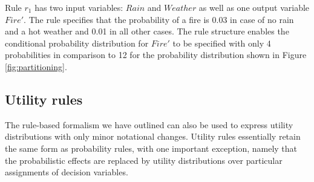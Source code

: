 Rule $r_1$ has two input variables: $\mathit{Rain}$ and $\mathit{Weather}$ as well as one output variable $\mathit{Fire}'$. The rule specifies that the probability of a fire is 0.03 in case of no rain and a hot weather and 0.01 in all other cases.  The rule structure enables the conditional probability distribution for $\mathit{Fire}'$ to be specified with only 4 probabilities in comparison to 12 for the probability distribution shown in Figure \ref{fig:partitioning}. 


\subsection{Utility rules}

The rule-based formalism we have outlined can also be used to express utility distributions with only minor notational changes. Utility rules essentially retain the same form as probability rules, with one important exception, namely that the probabilistic effects are replaced by utility distributions over particular assignments of decision variables. 

